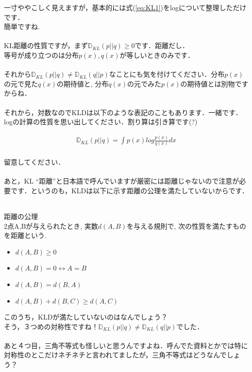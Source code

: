 \documentclass[11pt,a4paper,uplatex]{ujreport}
\begin{document}
一寸ややこしく見えますが，基本的には式(\ref{eq:KL1})をlogについて整理しただけです．\\簡単ですね.\\
\\

KL距離の性質ですが，まず$\mathbb{D}_{KL}(p||q) \geq 0$です．距離だし．\\
等号が成り立つのは分布$p(x), q(x)$が等しいときのみです．\\
\\

それから$\mathbb{D}_{KL}(p||q) \neq \mathbb{D}_{KL}(q||p)$なことにも気を付けてください．分布$p(x)$の元で見た$q(x)$の期待値と, 分布$q(x)$の元でみた$p(x)$の期待値とは別物ですからね．\\
\\

それから，対数なのでKLDは以下のような表記のこともあります．一緒です．logの計算の性質を思い出してください．割り算は引き算です(?)

\begin{eqnarray}
\label{eq:KLD-inv}
  \mathbb{D}_{KL}(p||q) =  \int p(x) log \frac{p(x)}{q(x)} dx
\end{eqnarray}
\\
留意してください．\\
\\

あと，KL ``距離''と日本語で呼んでいますが厳密には距離じゃないので注意が必要です．というのも，KLDは以下に示す距離の公理\cite{distance}を満たしていないからです．\\
\\

\begin{screen}
距離の公理\\
2点A,Bが与えられたとき, 実数$d(A,B)$を与える規則で, 次の性質を満たすものを距離という.
\begin{itemize}
\item{$d(A, B) \geq 0$}
\item{$d(A, B) = 0 \leftrightarrow A=B$}
\item{$d(A, B) = d(B, A)$}
\item{$d(A, B) + d(B, C) \geq d(A, C)$}
\end{itemize}
\end{screen}

このうち，KLDが満たしていないのはなんでしょう？\\
そう，３つめの対称性ですね！$\mathbb{D}_{KL}(p||q) \neq \mathbb{D}_{KL}(q||p)$でした．\\
\\
あと４つ目，三角不等式も怪しいと思うんですよね．呼んでた資料とかでは特に対称性のとこだけネチネチと言われてましたが，三角不等式はどうなんでしょう？\\
\\
\end{document}
